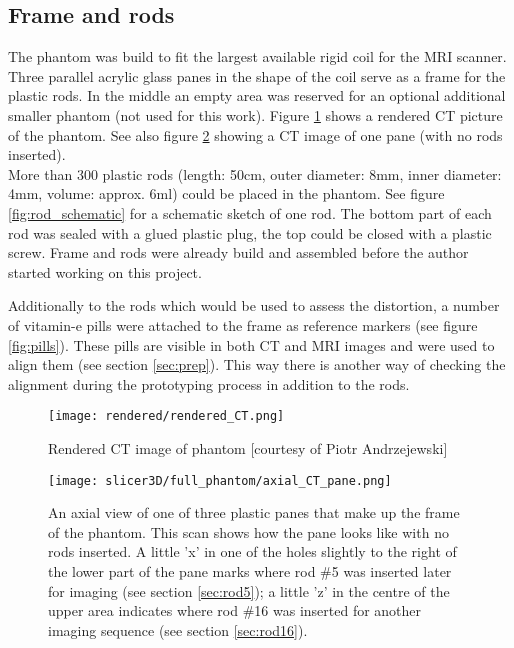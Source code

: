 \subsection{Frame and rods}

The phantom was build to fit the largest available rigid coil for the MRI scanner.
Three parallel acrylic glass panes in the shape of the coil serve as a frame for the plastic rods.
In the middle an empty area was reserved for an optional additional smaller phantom (not used for this work).
Figure \ref{fig:rendered_CT} shows a rendered CT picture of the phantom. See also figure \ref{fig:axial_CT_pane} showing a CT image of one pane (with no rods inserted). \\
More than 300 plastic rods (length: 50cm, outer diameter: 8mm, inner diameter: 4mm, volume: approx. 6ml) could be placed in the phantom.
See figure \ref{fig:rod_schematic} for a schematic sketch of one rod.
The bottom part of each rod was sealed with a glued plastic plug, the top could be closed with a plastic screw.
Frame and rods were already build and assembled before the author started working on this project.

Additionally to the rods which would be used to assess the distortion, a number of vitamin-e pills were attached to the frame as reference markers (see figure \ref{fig:pills}).
These pills are visible in both CT and MRI images and were used to align them (see section \ref{sec:prep}).
This way there is another way of checking the alignment during the prototyping process in addition to the rods.


\begin{figure}[!bp]
\centering
\texttt{[image: rendered/rendered\_CT.png]}
\caption{Rendered CT image of phantom [courtesy of Piotr Andrzejewski]}
\label{fig:rendered_CT}
\end{figure}


\begin{figure}[!tbp]
\centering
\texttt{[image: slicer3D/full\_phantom/axial\_CT\_pane.png]}
\caption{An axial view of one of three plastic panes that make up the frame of the phantom. This scan shows how the pane looks like with no rods inserted. A little 'x' in one of the holes slightly to the right of the lower part of the pane marks where rod \#5 was inserted later for imaging (see section \ref{sec:rod5}); a little 'z' in the centre of the upper area indicates where rod \#16 was inserted for another imaging sequence (see section \ref{sec:rod16}).}
\label{fig:axial_CT_pane}
\end{figure}

